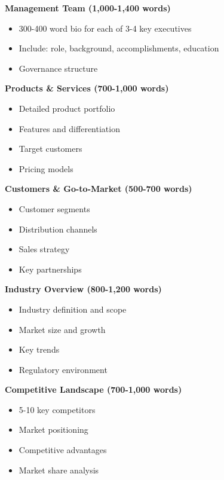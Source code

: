 \documentclass[11pt]{article}
\begin{document}
\textbf{Management Team (1,000-1,400 words)}

\begin{itemize}[leftmargin=*,itemsep=2pt,topsep=2pt]
\item {} 300-400 word bio for each of 3-4 key executives
\item {} Include: role, background, accomplishments, education
\item {} Governance structure
\end{itemize}

\textbf{Products \& Services (700-1,000 words)}

\begin{itemize}[leftmargin=*,itemsep=2pt,topsep=2pt]
\item {} Detailed product portfolio
\item {} Features and differentiation
\item {} Target customers
\item {} Pricing models
\end{itemize}

\textbf{Customers \& Go-to-Market (500-700 words)}

\begin{itemize}[leftmargin=*,itemsep=2pt,topsep=2pt]
\item {} Customer segments
\item {} Distribution channels
\item {} Sales strategy
\item {} Key partnerships
\end{itemize}

\textbf{Industry Overview (800-1,200 words)}

\begin{itemize}[leftmargin=*,itemsep=2pt,topsep=2pt]
\item {} Industry definition and scope
\item {} Market size and growth
\item {} Key trends
\item {} Regulatory environment
\end{itemize}

\textbf{Competitive Landscape (700-1,000 words)}

\begin{itemize}[leftmargin=*,itemsep=2pt,topsep=2pt]
\item {} 5-10 key competitors
\item {} Market positioning
\item {} Competitive advantages
\item {} Market share analysis
\end{itemize}
\end{document}
